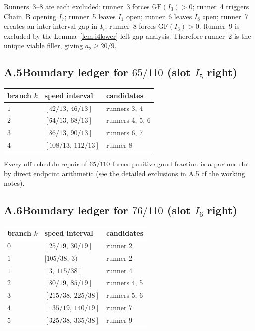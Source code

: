 \documentclass[12pt,a4paper]{amsart}
\theoremstyle{definition}
\theoremstyle{remark}
\newcommand{\GF}{\mathrm{GF}}
\begin{document}
Runners~3--8 are each excluded: runner~3 forces $\GF(I_3)>0$; runner~4 triggers
Chain~B opening $I_7$; runner~5 leaves $I_1$ open; runner~6 leaves $I_8$ open;
runner~7 creates an inter-interval gap in $I_7$; runner~8 forces $\GF(I_3)>0$.
Runner~9 is excluded by the Lemma~\ref{lem:i4lower} left-gap analysis.
Therefore runner~2 is the unique viable filler, giving $a_2\ge 20/9$.

\subsection*{A.5\quad Boundary ledger for $65/110$ (slot $I_5$ right)}

\begin{center}
\begin{tabular}{lll}
\toprule
branch $k$ & speed interval & candidates \\
\midrule
$1$ & $[42/13,\,46/13]$ & runners 3, 4 \\
$2$ & $[64/13,\,68/13]$ & runners 4, 5, 6 \\
$3$ & $[86/13,\,90/13]$ & runners 6, 7 \\
$4$ & $[108/13,\,112/13]$ & runner 8 \\
\bottomrule
\end{tabular}
\end{center}

Every off-schedule repair of $65/110$ forces positive good fraction in a partner slot by
direct endpoint arithmetic (see the detailed exclusions in A.5 of the working notes).

\subsection*{A.6\quad Boundary ledger for $76/110$ (slot $I_6$ right)}

\begin{center}
\begin{tabular}{lll}
\toprule
branch $k$ & speed interval & candidates \\
\midrule
$0$ & $[25/19,\,30/19]$ & runner 2 \\
$1$ & $[105/38,\,3)$ & runner 2 \\
$1$ & $[3,\,115/38]$ & runner 4 \\
$2$ & $[80/19,\,85/19]$ & runners 4, 5 \\
$3$ & $[215/38,\,225/38]$ & runners 5, 6 \\
$4$ & $[135/19,\,140/19]$ & runner 7 \\
$5$ & $[325/38,\,335/38]$ & runner 9 \\
\bottomrule
\end{tabular}
\end{center}
\end{document}
